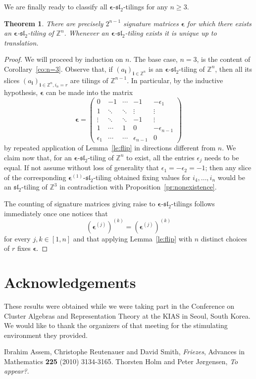 \documentclass{amsart}
\newtheorem{theorem}{Theorem}
\newcommand{\bepsilon}{\boldsymbol{\epsilon}}
\newcommand{\bi}{\boldsymbol{i}}
\newcommand{\fsl}{\mathfrak{sl}}
\newcommand{\ZZ}{\mathbb{Z}}
\begin{document}
  We are finally ready to classify all $\bepsilon$-$\fsl_2$-tilings for any $n\geq3$.
  \begin{theorem}
    There are precisely $2^{n-1}$ signature matrices $\bepsilon$ for which there exists an $\bepsilon$-$\fsl_2$-tiling of $\ZZ^n$.
    Whenever an $\bepsilon$-$\fsl_2$-tiling exists it is unique up to translation.
  \end{theorem}
  \begin{proof}
    We will proceed by induction on $n$. 
    The base case, $n=3$, is the content of Corollary~\ref{co:n=3}.
    Observe that, if $(a_{\bi})_{\bi\in\ZZ^n}$ is an $\bepsilon$-$\fsl_2$-tiling of $\ZZ^n$, then all its slices $(a_{\bi})_{\bi\in\ZZ^n,i_n=r}$ are tilings of $\ZZ^{n-1}$.
    In particular, by the inductive hypothesis, $\bepsilon$ can be made into the matrix
    \[
      \bepsilon = 
      \left(
        \begin{array}{ccccc}
          0          & -1     & \cdots  & -1              & -\epsilon_1     \\
          1          & \ddots & \ddots  & \vdots          & \vdots          \\
          \vdots     & \ddots & \ddots  & -1              & \vdots          \\
          1          & \cdots & 1       & 0               & -\epsilon_{n-1} \\
          \epsilon_1 & \cdots & \cdots  & \epsilon_{n-1}  & 0
        \end{array}
      \right)
    \]
    by repeated application of Lemma~\ref{le:flip} in directions different from $n$.
    We claim now that, for an $\bepsilon$-$\fsl_2$-tiling of $\ZZ^n$ to exist, all the entries $\epsilon_j$ needs to be equal. 
    If not assume without loss of generality that $\epsilon_1 = -\epsilon_2 = -1$; then any slice of the corresponding $\bepsilon^{(1)}$-$\fsl_2$-tiling obtained fixing values for $i_4,\dots,i_n$ would be an $\fsl_2$-tiling of $\ZZ^3$ in contradiction with Proposition~\ref{pr:nonexistence}.

    The counting of signature matrices giving raise to $\bepsilon$-$\fsl_2$-tilings follows immediately once one notices that 
    \[
      \left(\bepsilon^{(j)}\right)^{(k)}=\left(\bepsilon^{(j)}\right)^{(k)}
    \]
    for every $j,k\in[1,n]$ and that applying Lemma~\ref{le:flip} with $n$ distinct choices of $r$ fixes $\bepsilon$.
  \end{proof}

\section*{Acknowledgements}
  These results were obtained while we were taking part in the Conference on Cluster Algebras and Representation Theory at the KIAS in Seoul, South Korea. 
  We would like to thank the organizers of that meeting for the stimulating environment they provided.

\begin{thebibliography}{99}
   Ibrahim Assem, Christophe Reutenauer and David Smith, \emph{Friezes}, Advances in Mathematics {\bf 225} (2010) 3134-3165.
   Thorsten Holm and Peter J\o rgensen, \emph{To appear?}.
\end{thebibliography}
\end{document}
